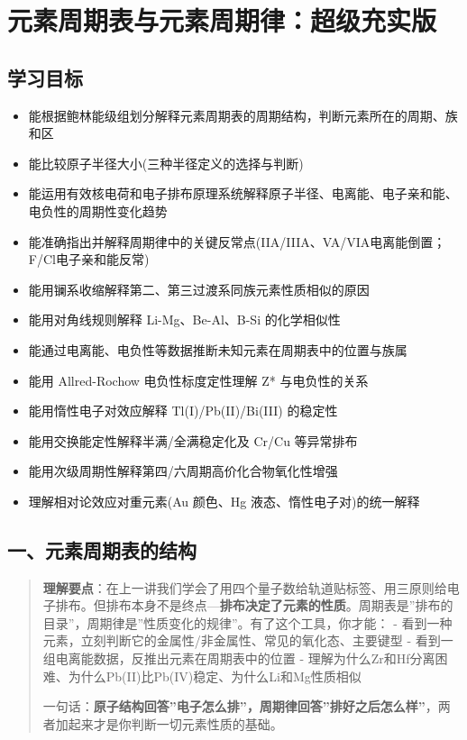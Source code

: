 \section{元素周期表与元素周期律：超级充实版}\label{ux5143ux7d20ux5468ux671fux8868ux4e0eux5143ux7d20ux5468ux671fux5f8bux8d85ux7ea7ux5145ux5b9eux7248}

\subsection{学习目标}\label{ux5b66ux4e60ux76eeux6807}

\begin{itemize}
\tightlist
\item
  能根据鲍林能级组划分解释元素周期表的周期结构，判断元素所在的周期、族和区
\item
  能比较原子半径大小(三种半径定义的选择与判断)
\item
  能运用有效核电荷和电子排布原理系统解释原子半径、电离能、电子亲和能、电负性的周期性变化趋势
\item
  能准确指出并解释周期律中的关键反常点(IIA/IIIA、VA/VIA电离能倒置；F/Cl电子亲和能反常)
\item
  能用镧系收缩解释第二、第三过渡系同族元素性质相似的原因
\item
  能用对角线规则解释 Li-Mg、Be-Al、B-Si 的化学相似性
\item
  能通过电离能、电负性等数据推断未知元素在周期表中的位置与族属
\item
  能用 Allred-Rochow 电负性标度定性理解 Z* 与电负性的关系
\item
  能用惰性电子对效应解释 Tl(I)/Pb(II)/Bi(III) 的稳定性
\item
  能用交换能定性解释半满/全满稳定化及 Cr/Cu 等异常排布
\item
  能用次级周期性解释第四/六周期高价化合物氧化性增强
\item
  理解相对论效应对重元素(Au 颜色、Hg 液态、惰性电子对)的统一解释
\end{itemize}

\subsection{一、元素周期表的结构}\label{ux4e00ux5143ux7d20ux5468ux671fux8868ux7684ux7ed3ux6784}

\begin{quote}
\textbf{理解要点}：在上一讲我们学会了用四个量子数给轨道贴标签、用三原则给电子排布。但排布本身不是终点---\textbf{排布决定了元素的性质}。周期表是''排布的目录''，周期律是''性质变化的规律''。有了这个工具，你才能：
- 看到一种元素，立刻判断它的金属性/非金属性、常见的氧化态、主要键型
- 看到一组电离能数据，反推出元素在周期表中的位置
- 理解为什么Zr和Hf分离困难、为什么Pb(II)比Pb(IV)稳定、为什么Li和Mg性质相似

一句话：\textbf{原子结构回答''电子怎么排''，周期律回答''排好之后怎么样''}，两者加起来才是你判断一切元素性质的基础。
\end{quote}

